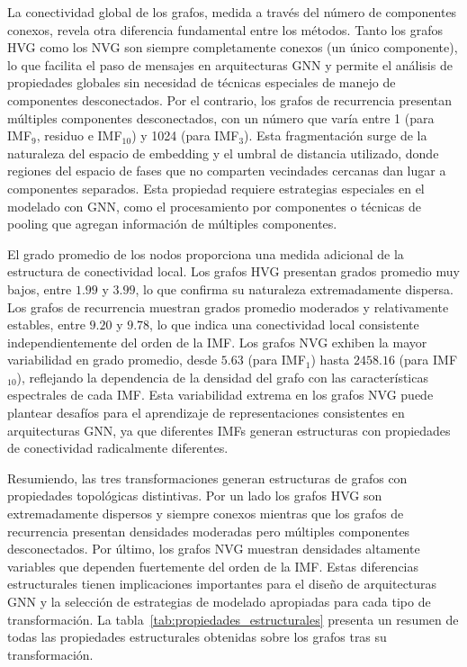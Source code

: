 \documentclass[11pt,a4paper]{article}
\begin{document}
La conectividad global de los grafos, medida a través del número de componentes conexos, revela otra diferencia fundamental entre los métodos. Tanto los grafos HVG como los NVG son siempre completamente conexos (un único componente), lo que facilita el paso de mensajes en arquitecturas GNN y permite el análisis de propiedades globales sin necesidad de técnicas especiales de manejo de componentes desconectados. Por el contrario, los grafos de recurrencia presentan múltiples componentes desconectados, con un número que varía entre 1 (para IMF$_9$, residuo e IMF$_{10}$) y 1024 (para IMF$_3$). Esta fragmentación surge de la naturaleza del espacio de embedding y el umbral de distancia utilizado, donde regiones del espacio de fases que no comparten vecindades cercanas dan lugar a componentes separados. Esta propiedad requiere estrategias especiales en el modelado con GNN, como el procesamiento por componentes o técnicas de pooling que agregan información de múltiples componentes.

El grado promedio de los nodos proporciona una medida adicional de la estructura de conectividad local. Los grafos HVG presentan grados promedio muy bajos, entre $1.99$ y $3.99$, lo que confirma su naturaleza extremadamente dispersa. Los grafos de recurrencia muestran grados promedio moderados y relativamente estables, entre $9.20$ y $9.78$, lo que indica una conectividad local consistente independientemente del orden de la IMF. Los grafos NVG exhiben la mayor variabilidad en grado promedio, desde $5.63$ (para IMF$_1$) hasta $2458.16$ (para IMF$_{10}$), reflejando la dependencia de la densidad del grafo con las características espectrales de cada IMF. Esta variabilidad extrema en los grafos NVG puede plantear desafíos para el aprendizaje de representaciones consistentes en arquitecturas GNN, ya que diferentes IMFs generan estructuras con propiedades de conectividad radicalmente diferentes.

Resumiendo, las tres transformaciones generan estructuras de grafos con propiedades topológicas distintivas. Por un lado los grafos HVG son extremadamente dispersos y siempre conexos mientras que los grafos de recurrencia presentan densidades moderadas pero múltiples componentes desconectados. Por último, los grafos NVG muestran densidades altamente variables que dependen fuertemente del orden de la IMF. Estas diferencias estructurales tienen implicaciones importantes para el diseño de arquitecturas GNN y la selección de estrategias de modelado apropiadas para cada tipo de transformación. La tabla~\ref{tab:propiedades_estructurales} presenta un resumen de todas las propiedades estructurales obtenidas sobre los grafos tras su transformación.
\end{document}
